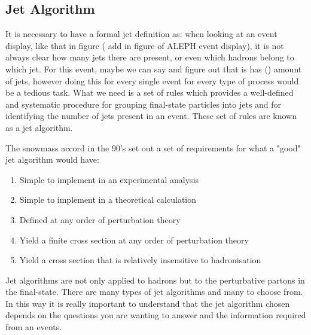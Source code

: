 \subsection{Jet Algorithm}
It is necessary to have a formal jet definition as: when looking at an event display, like that in figure ({\color{blue} add in figure of ALEPH event display}), it is not always clear how many jets there are present, or even which hadrons belong to which jet. For this event, maybe we can say and figure out that is has () amount of jets, however doing this for every single event for every type of process would be a tedious task. What we need is a set of rules which provides a well-defined and systematic procedure for grouping final-state particles into jets and for identifying the number of jets present in an event. These set of rules are known as a jet algorithm. 

The snowmass accord in the 90's set out a set of requirements for what a "good" jet algorithm would have:
\begin{enumerate}
	\item Simple to implement in an experimental analysis
	\item Simple to implement in a theoretical calculation
	\item Defined at any order of perturbation theory
	\item Yield a finite cross section at any order of perturbation theory
	\item Yield a cross section that is relatively insensitive to hadronisation
\end{enumerate} 

Jet algorithms are not only applied to hadrons but to the perturbative partons in the final-state. There are many types of jet algorithms and many to choose from. In this way it is really important to understand that the jet algorithm chosen depends on the questions you are wanting to answer and the information required from an events.

